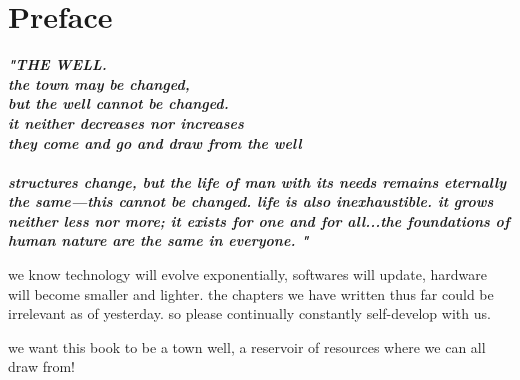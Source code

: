 
\chapter{Preface}
\begin{fullwidth}

{\itshape\bfseries "THE WELL.
\\
the town may be changed,
\\
but the well cannot be changed.
\\
it neither decreases nor increases
\\
they come and go and draw from the well
\\
\\
structures change, but the life of man with its needs remains eternally the same—this cannot be changed. life is also inexhaustible. it grows neither less nor more; it exists for one and for all...the foundations of human nature are the same in everyone. "
}

we know technology will evolve exponentially, softwares will update, hardware will become smaller and lighter. the chapters we have written thus far could be irrelevant as of yesterday. so please continually constantly self-develop with us. 

we want this book to be a town well, a reservoir of resources where we can all draw from!

\clearpage
\end{fullwidth}
